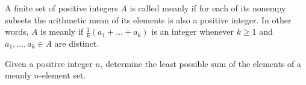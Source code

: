A finite set of positive integers $A$ is called meanly if for each of its nonempy subsets the arithmetic mean of its elements is also a positive integer. In other words, $A$ is meanly if $\frac{1}{k}(a_1 + \dots + a_k)$ is an integer whenever $k \ge 1$ and $a_1, \dots, a_k \in A$ are distinct.

Given a positive integer $n$,  determine the least possible sum of the elements of a meanly $n$-element set.